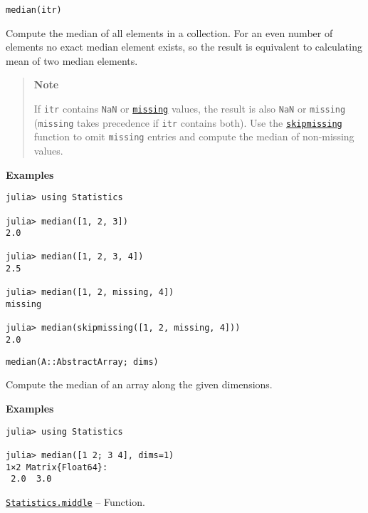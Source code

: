 \begin{adjustwidth}{2em}{0pt}


\begin{verbatim}
median(itr)
\end{verbatim}

Compute the median of all elements in a collection. For an even number of elements no exact median element exists, so the result is equivalent to calculating mean of two median elements.

\begin{quote}
\textbf{Note}

If \texttt{itr} contains \texttt{NaN} or \hyperlink{14596725676261444434}{\texttt{missing}} values, the result is also \texttt{NaN} or \texttt{missing} (\texttt{missing} takes precedence if \texttt{itr} contains both). Use the \hyperlink{2012470681884771400}{\texttt{skipmissing}} function to omit \texttt{missing} entries and compute the median of non-missing values.

\end{quote}
\textbf{Examples}


\begin{verbatim}
julia> using Statistics

julia> median([1, 2, 3])
2.0

julia> median([1, 2, 3, 4])
2.5

julia> median([1, 2, missing, 4])
missing

julia> median(skipmissing([1, 2, missing, 4]))
2.0
\end{verbatim}




\begin{lstlisting}
median(A::AbstractArray; dims)
\end{lstlisting}

Compute the median of an array along the given dimensions.

\textbf{Examples}


\begin{lstlisting}
julia> using Statistics

julia> median([1 2; 3 4], dims=1)
1×2 Matrix{Float64}:
 2.0  3.0
\end{lstlisting}



\end{adjustwidth}
\hypertarget{14662071173540942276}{}
\hyperlink{14662071173540942276}{\texttt{Statistics.middle}}  -- {Function.}

